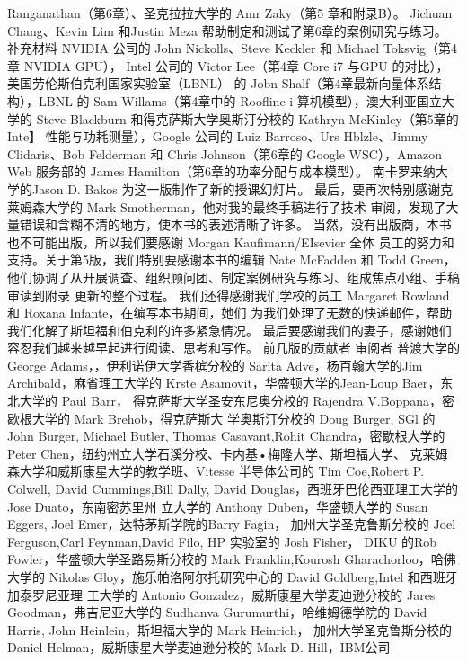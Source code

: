 Ranganathan（第6章）、圣克拉拉大学的 Amr Zaky（第5 章和附录B）。
Jichuan Chang、Kevin Lim 和Justin Meza 帮助制定和测试了第6章的案例研究与练习。
补充材料
NVIDIA 公司的 John Nickolls、Steve Keckler 和 Michael Toksvig（第4章 NVIDIA GPU），
Intel 公司的 Victor Lee（第4章 Core i7 与GPU 的对比），美国劳伦斯伯克利国家实验室（LBNL）
的 Jobn Shalf（第4章最新向量体系结构），LBNL 的 Sam Willams（第4章中的 Roofline i
算机模型），澳大利亚国立大学的 Steve Blackburn 和得克萨斯大学奥斯汀分校的 Kathryn
McKinley（第5章的 Inte】 性能与功耗测量），Google 公司的 Luiz Barroso、Urs Hblzle、Jimmy
Clidaris、Bob Felderman 和 Chris Johnson（第6章的 Google WSC），Amazon Web 服务部的 James
Hamilton（第6章的功率分配与成本模型）。
南卡罗来纳大学的Jason D. Bakos 为这一版制作了新的授课幻灯片。
最后，要再次特别感谢克莱姆森大学的 Mark Smotherman，他对我的最终手稿进行了技术
审阅，发现了大量错误和含糊不清的地方，使本书的表述清晰了许多。
当然，没有出版商，本书也不可能出版，所以我们要感谢 Morgan Kaufimann/EIsevier 全体
员工的努力和支持。关于第5版，我们特别要感谢本书的编辑 Nate McFadden 和 Todd Green，
他们协调了从开展调查、组织顾问团、制定案例研究与练习、组成焦点小组、手稿审读到附录
更新的整个过程。
我们还得感谢我们学校的员工 Margaret Rowland 和 Roxana Infante，在编写本书期间，她们
为我们处理了无数的快递邮件，帮助我们化解了斯坦福和伯克利的许多紧急情况。
最后要感谢我们的妻子，感谢她们容忍我们越来越早起进行阅读、思考和写作。
前几版的贡献者
审阅者
普渡大学的 George Adams，，伊利诺伊大学香槟分校的 Sarita Adve，杨百翰大学的Jim
Archibald，麻省理工大学的 Krste Asamovit，华盛顿大学的Jean-Loup Baer，东北大学的 Paul Barr，
得克萨斯大学圣安东尼奥分校的 Rajendra V.Boppana，密歇根大学的 Mark Brehob，得克萨斯大
学奥斯汀分校的 Doug Burger, SGl 的 John Burger, Michael Butler, Thomas Casavant,Rohit
Chandra，密歇根大学的 Peter Chen，纽约州立大学石溪分校、卡内基•梅隆大学、斯坦福大学、
克莱姆森大学和威斯康星大学的教学班、Vitesse 半导体公司的 Tim Coe,Robert P. Colwell, David
Cummings,Bill Dally, David Douglas，西班牙巴伦西亚理工大学的Jose Duato，东南密苏里州
立大学的 Anthony Duben，华盛顿大学的 Susan Eggers, Joel Emer，达特茅斯学院的Barry Fagin，
加州大学圣克鲁斯分校的 Joel Ferguson,Carl Feynman,David Filo, HP 实验室的 Josh Fisher，
DIKU 的Rob Fowler，华盛顿大学圣路易斯分校的 Mark Franklin,Kourosh Gharachorloo，哈佛
大学的 Nikolas Gloy，施乐帕洛阿尔托研究中心的 David Goldberg,Intel 和西班牙加泰罗尼亚理
工大学的 Antonio Gonzalez，威斯康星大学麦迪逊分校的 Jares Goodman，弗吉尼亚大学的
Sudhanva Gurumurthi，哈维姆德学院的 David Harris, John Heinlein，斯坦福大学的 Mark Heinrich，
加州大学圣克鲁斯分校的 Daniel Helman，威斯康星大学麦迪逊分校的 Mark D. Hill，IBM公司
